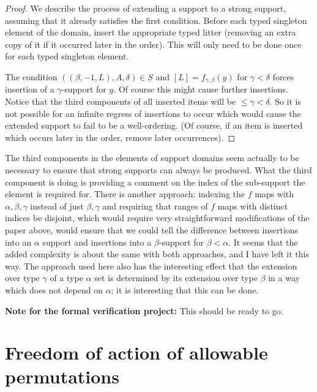 \begin{description}
\begin{proof}
We describe the process of extending a support to a strong support, assuming that it already satisfies the first condition.  Before each typed singleton element of the domain, insert the appropriate typed litter (removing an extra copy of it if it occurred later in the order).  This will only need to be done once for each typed singleton element.

The condition $((\beta,-1,L),A,\delta) \in S$ and $[L]=f_{\gamma,\beta}(y)$ for $\gamma<\delta$ forces insertion of a $\gamma$-support for $y$.  Of course this might cause further insertions.  Notice that
the third components of all inserted items will be $\leq \gamma <\delta$.  So it is not possible for an infinite regress of insertions to occur which would cause the extended support to fail to be a well-ordering.  (Of course, if an item is inserted which occurs later in the order, remove later occurrences).
\end{proof}

\end{description}

The third components in the elements of support domains seem actually to be necessary to ensure that strong supports can always be produced.  What the third component is doing is providing a comment on the index of the sub-support the element is required for.  There is another approach:  indexing the $f$ maps with $\alpha,\beta,\gamma$ instead of just $\beta,\gamma$ and requiring that ranges of $f$ maps with distinct indices be disjoint, which would require very straightforward modifications of the paper above, would ensure that we could tell the difference between insertions into an $\alpha$ support and insertions into a $\beta$-support for $\beta<\alpha$.  It seems that the added complexity is about the same with both approaches, and I have left it this way.  The approach used here also has the interesting effect that the extension over type $\gamma$ of a type $\alpha$ set is determined by its extension over type $\beta$ in a way which does not depend on $\alpha$;  it is interesting that this can be done.


{\bf Note for the formal verification project:}  This should be ready to go.
\newpage
\section{Freedom of action of allowable permutations}

